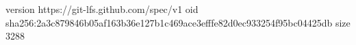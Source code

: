 version https://git-lfs.github.com/spec/v1
oid sha256:2a3c879846b05af163b36e127b1c469ace3efffe82d0ec933254f95bc04425db
size 3288

